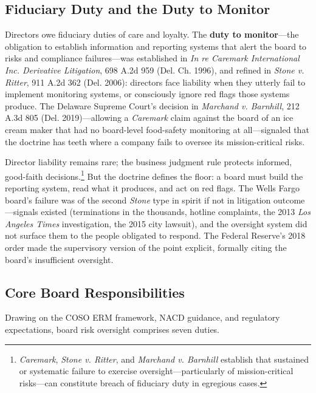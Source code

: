 \documentclass[11pt,openany]{book}
\begin{document}
\subsection{Fiduciary Duty and the Duty to Monitor}
\label{subsec:caremark}

Directors owe fiduciary duties of care and loyalty. The \textbf{duty to
monitor}---the obligation to establish information and reporting systems that
alert the board to risks and compliance failures---was established in
\emph{In re Caremark International Inc. Derivative Litigation}, 698 A.2d 959
(Del. Ch. 1996), and refined in \emph{Stone v. Ritter}, 911 A.2d 362 (Del.
2006): directors face liability when they utterly fail to implement
monitoring systems, or consciously ignore red flags those systems produce.
The Delaware Supreme Court's decision in \emph{Marchand v. Barnhill}, 212
A.3d 805 (Del. 2019)---allowing a \emph{Caremark} claim against the board of
an ice cream maker that had no board-level food-safety monitoring at
all---signaled that the doctrine has teeth where a company fails to oversee
its mission-critical risks.

Director liability remains rare; the business judgment rule protects
informed, good-faith decisions.\footnote{\emph{Caremark}, \emph{Stone v.
Ritter}, and \emph{Marchand v. Barnhill} establish that sustained or
systematic failure to exercise oversight---particularly of mission-critical
risks---can constitute breach of fiduciary duty in egregious cases.} But the
doctrine defines the floor: a board must build the reporting system, read
what it produces, and act on red flags. The Wells Fargo board's failure was
of the second \emph{Stone} type in spirit if not in litigation
outcome---signals existed (terminations in the thousands, hotline complaints,
the 2013 \emph{Los Angeles Times} investigation, the 2015 city lawsuit), and
the oversight system did not surface them to the people obligated to respond.
The Federal Reserve's 2018 order made the supervisory version of the point
explicit, formally citing the board's insufficient oversight.

\subsection{Core Board Responsibilities}

Drawing on the COSO ERM framework, NACD guidance, and regulatory
expectations, board risk oversight comprises seven duties.
\end{document}
